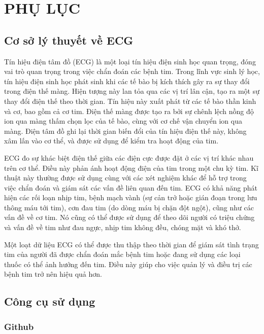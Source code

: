 
\section*{PHỤ LỤC}

\subsection*{Cơ sở lý thuyết về ECG}

Tín hiệu điện tâm đồ (ECG) là một loại tín hiệu điện sinh học quan trọng, đóng vai trò quan trọng trong việc chẩn đoán các bệnh tim. Trong lĩnh vực sinh lý học, tín hiệu điện sinh học phát sinh khi các tế bào bị kích thích gây ra sự thay đổi trong điện thế màng. Hiện tượng này lan tỏa qua các vị trí lân cận, tạo ra một sự thay đổi điện thế theo thời gian. Tín hiệu này xuất phát từ các tế bào thần kinh và cơ, bao gồm cả cơ tim. Điện thế màng được tạo ra bởi sự chênh lệch nồng độ ion qua màng thấm chọn lọc của tế bào, cùng với cơ chế vận chuyển ion qua màng. Điện tâm đồ ghi lại thời gian biến đổi của tín hiệu điện thế này, không xâm lấn vào cơ thể, và được sử dụng để kiểm tra hoạt động của tim.


ECG đo sự khác biệt điện thế giữa các điện cực được đặt ở các vị trí khác nhau trên cơ thể. Điều này phản ánh hoạt động điện của tim trong một chu kỳ tim. Kĩ thuật này thường được sử dụng cùng với các xét nghiệm khác để hỗ trợ trong việc chẩn đoán và giám sát các vấn đề liên quan đến tim. ECG có khả năng phát hiện các rối loạn nhịp tim, bệnh mạch vành (sự cản trở hoặc gián đoạn trong lưu thông máu tới tim), cơn đau tim (do dòng máu bị chặn đột ngột), cũng như các vấn đề về cơ tim. Nó cũng có thể được sử dụng để theo dõi người có triệu chứng và vấn đề về tim như đau ngực, nhịp tim không đều, chóng mặt và khó thở.


Một loạt dữ liệu ECG có thể được thu thập theo thời gian để giám sát tình trạng tim của người đã được chẩn đoán mắc bệnh tim hoặc đang sử dụng các loại thuốc có thể ảnh hưởng đến tim. Điều này giúp cho việc quản lý và điều trị các bệnh tim trở nên hiệu quả hơn.


\subsection*{Công cụ sử dụng}

\subsubsection*{Github}

